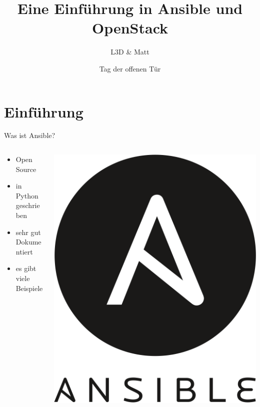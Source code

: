 \documentclass[aspectratio=169]{beamer}
\title{Eine Einführung in Ansible und OpenStack}
\author{L3D \& Matt}
\institute[Toolbox Bodensee]
\date{Tag der offenen Tür \the\year}
\begin{document}
\begin{frame}
  \titlepage
\end{frame}

\section{Einführung} 
\begin{frame}{Was ist Ansible?}
    \begin{columns}
        \begin{column}{0.4\textwidth}
            \begin{itemize}
                \item Open Source
                \item in Python geschrieben
                \item sehr gut Dokumentiert
                \item es gibt viele Beispiele
            \end{itemize}
        \end{column}
        \begin{column}{0.2\textwidth}
            \includegraphics[width=1\textwidth]{832px-Ansible_logo.png}

\end{column}
\end{columns}
\end{frame}
\end{document}
